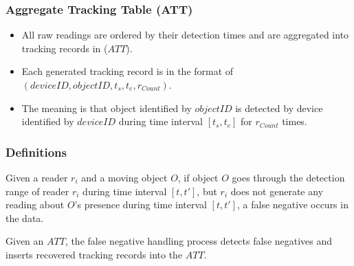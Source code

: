 \begin{frame}
\frametitle{Aggregate Tracking Table (ATT)~\cite{baba2013spatiotemporal}}

\begin{itemize}

  \item All raw readings are ordered by their detection times and are aggregated into tracking records in ($ATT$).

  \item Each generated tracking record is in the format of $(deviceID, objectID, t_s, t_e, r_{Count})$.

  \item The meaning is that object identified by $objectID$ is detected by device identified by $deviceID$ during time interval $[t_s, t_e]$ for $r_{Count}$ times.
\end{itemize}

\end{frame}


\begin{frame}
\frametitle{Definitions}

\begin{definition}
  Given a reader $r_i$ and a moving object $O$, if object $O$ goes through the detection range of reader $r_i$ during time interval $[t, t']$, but $r_i$ does not generate any reading about $O$'s presence during time interval $[t, t']$, a false negative occurs in the data.
\end{definition}

\begin{definition}
  Given an $ATT$, the false negative handling process detects false negatives and inserts recovered tracking records into the $ATT$.
\end{definition}

\end{frame}


